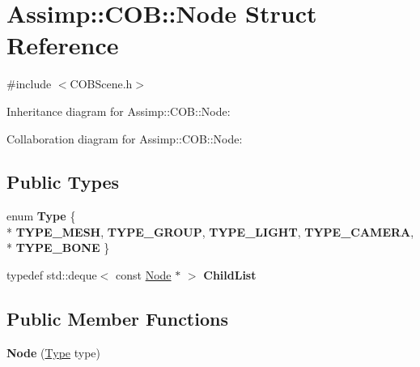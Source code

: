 \hypertarget{struct_assimp_1_1_c_o_b_1_1_node}{\section{Assimp\+:\+:C\+O\+B\+:\+:Node Struct Reference}
\label{struct_assimp_1_1_c_o_b_1_1_node}
}


{\ttfamily \#include $<$C\+O\+B\+Scene.\+h$>$}



Inheritance diagram for Assimp\+:\+:C\+O\+B\+:\+:Node\+:


Collaboration diagram for Assimp\+:\+:C\+O\+B\+:\+:Node\+:
\subsection*{Public Types}
\begin{DoxyCompactItemize}
\item 
\hypertarget{struct_assimp_1_1_c_o_b_1_1_node_a2e8702297e0c06f96641f4d56bd61b95}{enum {\bfseries Type} \{ \\*
{\bfseries T\+Y\+P\+E\+\_\+\+M\+E\+S\+H}, 
{\bfseries T\+Y\+P\+E\+\_\+\+G\+R\+O\+U\+P}, 
{\bfseries T\+Y\+P\+E\+\_\+\+L\+I\+G\+H\+T}, 
{\bfseries T\+Y\+P\+E\+\_\+\+C\+A\+M\+E\+R\+A}, 
\\*
{\bfseries T\+Y\+P\+E\+\_\+\+B\+O\+N\+E}
 \}}\label{struct_assimp_1_1_c_o_b_1_1_node_a2e8702297e0c06f96641f4d56bd61b95}

\item 
\hypertarget{struct_assimp_1_1_c_o_b_1_1_node_a781418685833b245727fdb237dfcc6e2}{typedef std\+::deque$<$ const \hyperlink{struct_assimp_1_1_c_o_b_1_1_node}{Node} $\ast$ $>$ {\bfseries Child\+List}}\label{struct_assimp_1_1_c_o_b_1_1_node_a781418685833b245727fdb237dfcc6e2}

\end{DoxyCompactItemize}
\subsection*{Public Member Functions}
\begin{DoxyCompactItemize}
\item 
\hypertarget{struct_assimp_1_1_c_o_b_1_1_node_a65c970cb943ced2d747e91e4f150719b}{{\bfseries Node} (\hyperlink{struct_type}{Type} type)}\label{struct_assimp_1_1_c_o_b_1_1_node_a65c970cb943ced2d747e91e4f150719b}

\end{DoxyCompactItemize}
